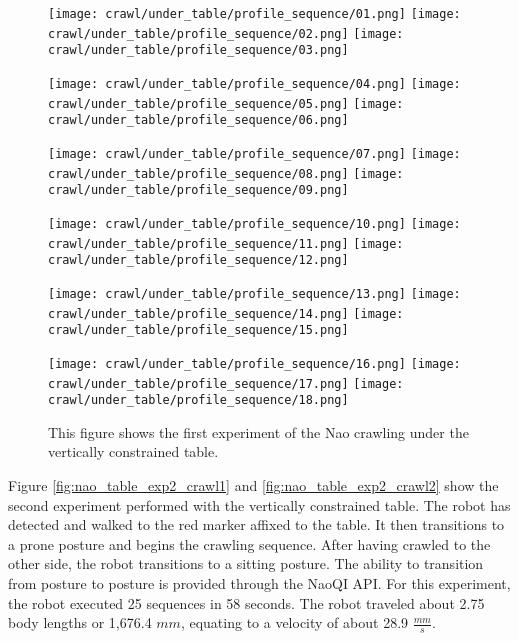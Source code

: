 \begin{figure}
  \centerline{
    \texttt{[image: crawl/under\_table/profile\_sequence/01.png]}
    \texttt{[image: crawl/under\_table/profile\_sequence/02.png]}
    \texttt{[image: crawl/under\_table/profile\_sequence/03.png]}
  }
  \vspace*{0.05in}
  \centerline{
    \texttt{[image: crawl/under\_table/profile\_sequence/04.png]}
    \texttt{[image: crawl/under\_table/profile\_sequence/05.png]}
    \texttt{[image: crawl/under\_table/profile\_sequence/06.png]}
  }
    \vspace*{0.05in}
  \centerline{
    \texttt{[image: crawl/under\_table/profile\_sequence/07.png]}
    \texttt{[image: crawl/under\_table/profile\_sequence/08.png]}
    \texttt{[image: crawl/under\_table/profile\_sequence/09.png]}
  }
    \vspace*{0.05in}
  \centerline{
    \texttt{[image: crawl/under\_table/profile\_sequence/10.png]}
    \texttt{[image: crawl/under\_table/profile\_sequence/11.png]}
    \texttt{[image: crawl/under\_table/profile\_sequence/12.png]}
  }
    \vspace*{0.05in}
  \centerline{
    \texttt{[image: crawl/under\_table/profile\_sequence/13.png]}
    \texttt{[image: crawl/under\_table/profile\_sequence/14.png]}
    \texttt{[image: crawl/under\_table/profile\_sequence/15.png]}
  }
    \vspace*{0.05in}
  \centerline{
    \texttt{[image: crawl/under\_table/profile\_sequence/16.png]}
    \texttt{[image: crawl/under\_table/profile\_sequence/17.png]}
    \texttt{[image: crawl/under\_table/profile\_sequence/18.png]}
  }
  \caption{This figure shows the first experiment of the Nao crawling under the vertically constrained table.}
  \label{fig:nao_table_exp1_crawl1}
\end{figure}

Figure \ref{fig:nao_table_exp2_crawl1} and \ref{fig:nao_table_exp2_crawl2} show the second
experiment performed with the vertically constrained table. The robot has detected and walked to
the red marker affixed to the table. It then transitions to a prone posture and begins the crawling
sequence. After having crawled to the other side, the robot transitions to a sitting posture.
The ability to transition from posture to posture is provided through the NaoQI API.
For this experiment, the robot executed 25 sequences in 58 seconds. The robot traveled
about 2.75 body lengths or 1,676.4 $mm$, equating to a velocity of about 28.9 $\frac{mm}{s}$.

